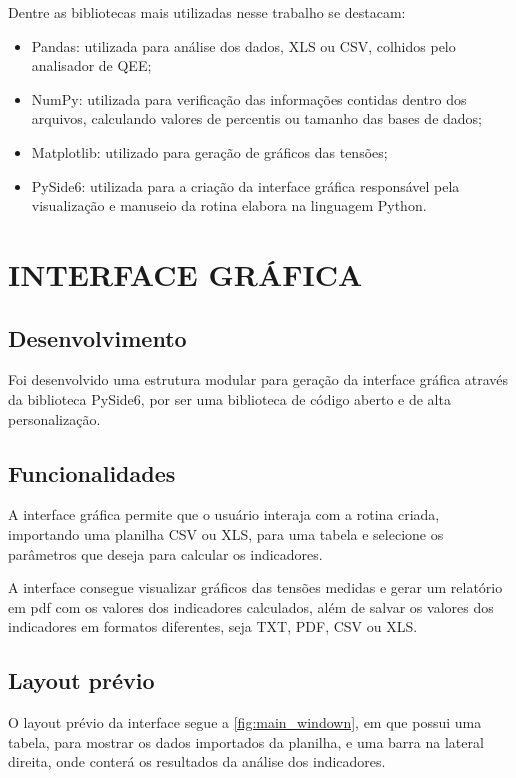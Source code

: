 Dentre as bibliotecas mais utilizadas nesse trabalho se destacam:

\begin{itemize}
  \item Pandas: utilizada para análise dos dados, XLS ou CSV, colhidos pelo analisador de QEE;
  \item NumPy: utilizada para verificação das informações contidas dentro dos arquivos, calculando valores de percentis ou tamanho das bases de dados;
  \item Matplotlib: utilizado para geração de gráficos das tensões;
  \item PySide6: utilizada para a criação da interface gráfica responsável pela visualização e manuseio da rotina elabora na linguagem Python.
\end{itemize}

\section{INTERFACE GRÁFICA}

\subsection{Desenvolvimento}

Foi desenvolvido uma estrutura modular para geração da interface gráfica através da biblioteca PySide6, por ser uma biblioteca de código aberto e de alta personalização.

\subsection{Funcionalidades}

A interface gráfica permite que o usuário interaja com a rotina criada, importando uma planilha CSV ou XLS, para uma tabela e selecione os parâmetros que deseja para calcular os indicadores.

A interface consegue visualizar gráficos das tensões medidas e gerar um relatório em pdf com os valores dos indicadores calculados, além de salvar os valores dos indicadores em formatos diferentes, seja TXT, PDF, CSV ou XLS.

\subsection{Layout prévio}

O layout prévio da interface segue a \autoref{fig:main_windown}, em que possui uma tabela, para mostrar os dados importados da planilha, e uma barra na lateral direita, onde conterá os resultados da análise dos indicadores.

